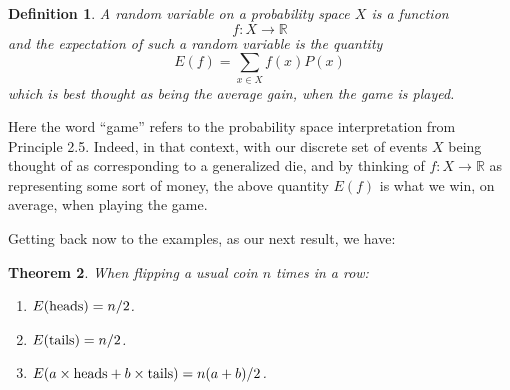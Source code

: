 \documentclass[12pt]{amsbook}
\newtheorem{theorem}{Theorem}[chapter]
\newtheorem{definition}[theorem]{Definition}
\begin{document}

\begin{definition}
A random variable on a probability space $X$ is a function
$$f:X\to\mathbb R$$
and the expectation of such a random variable is the quantity
$$E(f)=\sum_{x\in X}f(x)P(x)$$
which is best thought as being the average gain, when the game is played.
\end{definition}

Here the word ``game'' refers to the probability space interpretation from Principle 2.5. Indeed, in that context, with our discrete set of events $X$ being thought of as corresponding to a generalized die, and by thinking of $f:X\to\mathbb R$ as representing some sort of money, the above quantity $E(f)$ is what we win, on average, when playing the game.

\bigskip

Getting back now to the examples, as our next result, we have:

\begin{theorem}
When flipping a usual coin $n$ times in a row:
\begin{enumerate}
\item $E({\rm heads})=n/2$.

\item $E({\rm tails})=n/2$.

\item $E(a\times{\rm heads}+b\times{\rm tails})=n(a+b)/2$.
\end{enumerate} 
\end{theorem}
\end{document}
